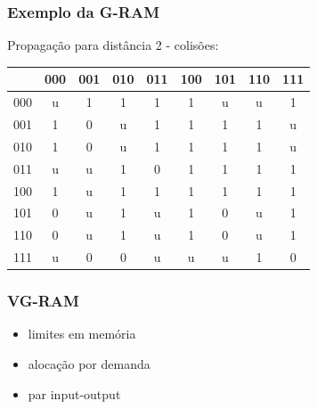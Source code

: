 \documentclass{beamer}
\begin{document}
\begin{frame}
    \frametitle{Exemplo da G-RAM}
    Propagação para distância 2 - colisões:

    \begin{table}
        \centering
        \begin{tabular}{|c|c|c|c|c|c|c|c|c|}
            \hline
                &       000 &       001 &       010 &       011 &       100 &       101 &       110 &       111\\
            \hline
            000 &        u  &        1  &        1  &        1  &        1  &        u  &        u  &        1 \\
            \hline
            001 &        1  & \alert 0  &        u  &        1  &        1  &        1  &        1  &        u \\
            \hline
            010 &        1  & \alert 0  &        u  &        1  &        1  &        1  &        1  &        u \\
            \hline
            011 & \alert u  &        u  &        1  & \alert 0  &        1  &        1  &        1  &        1 \\
            \hline
            100 &        1  & \alert u  &        1  &        1  &        1  &        1  &        1  &        1 \\
            \hline
            101 & \alert 0  &        u  &        1  & \alert u  &        1  & \alert 0  &        u  &        1 \\
            \hline
            110 & \alert 0  &        u  &        1  & \alert u  &        1  & \alert 0  &        u  &        1 \\
            \hline
            111 &        u  &        0  & \alert 0  &        u  & \alert u  &        u  &        1  & \alert 0 \\
            \hline

        \end{tabular}
    \end{table}
\end{frame}
\begin{frame}
    \frametitle{VG-RAM}
    \begin{itemize}
        \item limites em memória
        \item alocação por demanda
        \item par input-output
    \end{itemize}
\end{frame}
\end{document}

